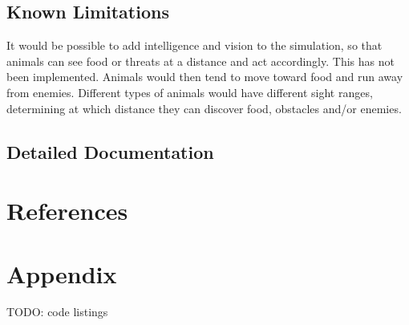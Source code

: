 \documentclass[12pt]{article}
\begin{document}
\subsection{Known Limitations}

It would be possible to add intelligence and vision to the simulation, so that animals can see food or threats at a distance and act accordingly. This has not been implemented. Animals would then tend to move toward food and run away from enemies. Different types of animals would have different sight ranges, determining at which distance they can discover food, obstacles and/or enemies.

\subsection{Detailed Documentation} %

\section{References}

\section{Appendix}

TODO: code listings
\end{document}
